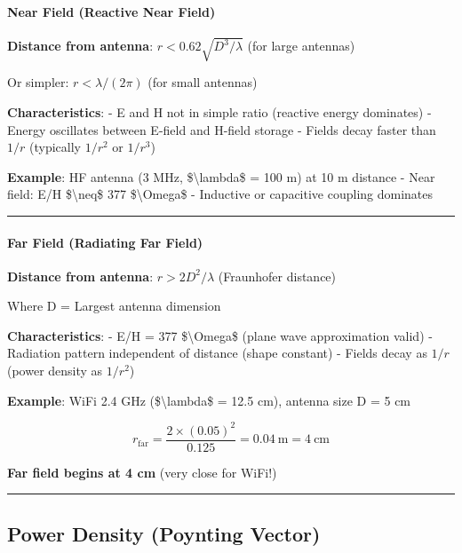 \paragraph{Near Field (Reactive Near
Field)}\label{near-field-reactive-near-field}

\textbf{Distance from antenna}: \(r < 0.62\sqrt{D^3/\lambda}\) (for
large antennas)

Or simpler: \(r < \lambda/(2\pi)\) (for small antennas)

\textbf{Characteristics}: - E and H not in simple ratio (reactive energy
dominates) - Energy oscillates between E-field and H-field storage -
Fields decay faster than \(1/r\) (typically \(1/r^2\) or \(1/r^3\))

\textbf{Example}: HF antenna (3 MHz, \$\textbackslash lambda\$ = 100 m)
at 10 m distance - Near field: E/H \$\textbackslash neq\$ 377
\$\textbackslash Omega\$ - Inductive or capacitive coupling dominates

\begin{center}\rule{0.5\linewidth}{0.5pt}\end{center}

\paragraph{Far Field (Radiating Far
Field)}\label{far-field-radiating-far-field}

\textbf{Distance from antenna}: \(r > 2D^2/\lambda\) (Fraunhofer
distance)

Where D = Largest antenna dimension

\textbf{Characteristics}: - E/H = 377 \$\textbackslash Omega\$ (plane
wave approximation valid) - Radiation pattern independent of distance
(shape constant) - Fields decay as \(1/r\) (power density as \(1/r^2\))

\textbf{Example}: WiFi 2.4 GHz (\$\textbackslash lambda\$ = 12.5 cm),
antenna size D = 5 cm

\[
r_{\text{far}} = \frac{2 \times (0.05)^2}{0.125} = 0.04\ \text{m} = 4\ \text{cm}
\]

\textbf{Far field begins at 4 cm} (very close for WiFi!)

\begin{center}\rule{0.5\linewidth}{0.5pt}\end{center}

\subsection{Power Density (Poynting
Vector)}\label{power-density-poynting-vector}

